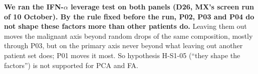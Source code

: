 
\begin{coreanswer}
\textbf{We ran the IFN-$\alpha$ leverage test on both panels (D26, MX's screen run of 10 October). By the rule fixed before the run, P02, P03 and P04 do not shape these factors more than other patients do.} Leaving them out moves the malignant axis beyond random drops of the same composition, mostly through P03, but on the primary axis never beyond what leaving out another patient set does; P01 moves it most. So hypothesis H-S1-05 (``they shape the factors'') is not supported for PCA and FA.
\end{coreanswer}


